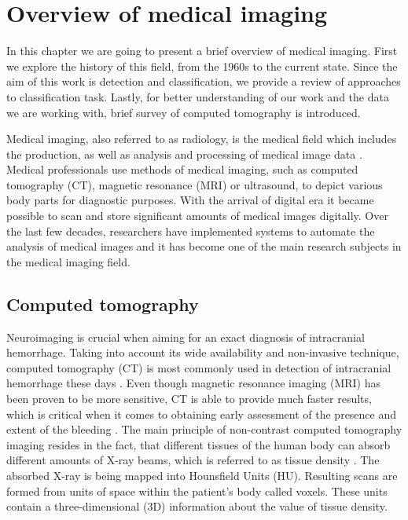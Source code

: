 \chapter{Overview of medical imaging}
In this chapter we are going to present a brief overview of medical imaging. First we explore the history of this field, from the 1960s to the current state. Since the aim of this work is detection and classification, we provide a review of approaches to classification task. Lastly, for better understanding of our work and the data we are working with, brief survey of computed tomography is introduced.

Medical imaging, also referred to as radiology, is the medical field which includes the production, as well as analysis and processing of medical image data \cite{diagnostic50years}. Medical professionals use methods of medical imaging, such as computed tomography (CT), magnetic resonance (MRI) or ultrasound, to depict various body parts for diagnostic purposes. With the arrival of digital era it became possible to scan and store significant amounts of medical images digitally. Over the last few decades, researchers have implemented systems to automate the analysis of medical images and it has become one of the main research subjects in the medical imaging field. 

\section{Computed tomography}
Neuroimaging is crucial when aiming for an exact diagnosis of intracranial hemorrhage.  Taking into account its wide availability and non-invasive technique, computed tomography (CT) is most commonly used in detection of intracranial hemorrhage these days \cite{imagingICH}. Even though magnetic resonance imaging (MRI) has been proven to be more sensitive, CT is able to provide much faster results, which is critical when it comes to obtaining early assessment of the presence and extent of the bleeding \cite{imagingAfterBrainInjury}. The main principle of non-contrast computed tomography imaging resides in the fact, that different tissues of the human body can absorb different amounts of X-ray beams, which is referred to as tissue density \cite{principlesOfCT}. The absorbed X-ray is being mapped into Hounsfield Units (HU). Resulting scans are formed from units of space within the patient's body called voxels. These units contain a three-dimensional (3D) information about the value of tissue density. 
